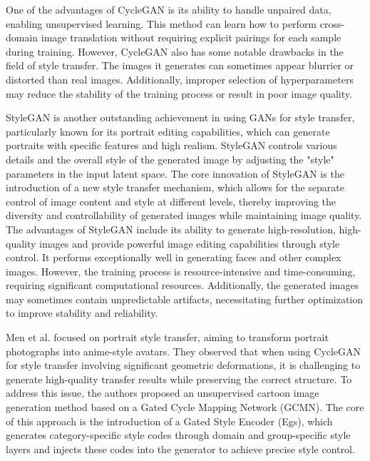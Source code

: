 \documentclass[preprint,12pt]{elsarticle}
\begin{document}
One of the advantages of CycleGAN is its ability to handle unpaired data, enabling unsupervised learning. This method can learn how to perform cross-domain image translation without requiring explicit pairings for each sample during training. However, CycleGAN also has some notable drawbacks in the field of style transfer. The images it generates can sometimes appear blurrier or distorted than real images. Additionally, improper selection of hyperparameters may reduce the stability of the training process or result in poor image quality.

StyleGAN\citep{19karras2019style} is another outstanding achievement in using GANs for style transfer, particularly known for its portrait editing capabilities, which can generate portraits with specific features and high realism. StyleGAN controls various details and the overall style of the generated image by adjusting the "style" parameters in the input latent space. The core innovation of StyleGAN is the introduction of a new style transfer mechanism, which allows for the separate control of image content and style at different levels, thereby improving the diversity and controllability of generated images while maintaining image quality. The advantages of StyleGAN include its ability to generate high-resolution, high-quality images and provide powerful image editing capabilities through style control. It performs exceptionally well in generating faces and other complex images. However, the training process is resource-intensive and time-consuming, requiring significant computational resources. Additionally, the generated images may sometimes contain unpredictable artifacts, necessitating further optimization to improve stability and reliability.

Men et al.\citep{46Men_2022_CVPR} focused on portrait style transfer, aiming to transform portrait photographs into anime-style avatars. They observed that when using CycleGAN for style transfer involving significant geometric deformations, it is challenging to generate high-quality transfer results while preserving the correct structure. To address this issue, the authors proposed an unsupervised cartoon image generation method based on a Gated Cycle Mapping Network (GCMN). The core of this approach is the introduction of a Gated Style Encoder (Egs), which generates category-specific style codes through domain and group-specific style layers and injects these codes into the generator to achieve precise style control.
\end{document}
